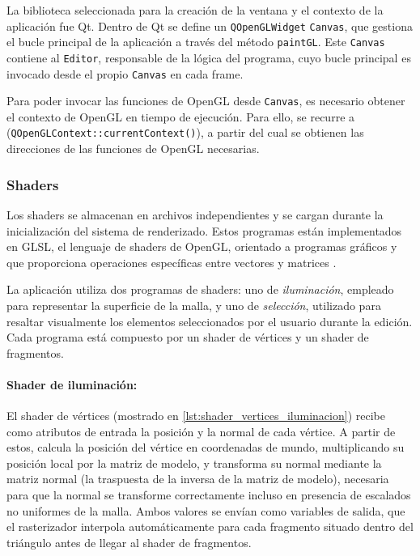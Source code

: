 La biblioteca seleccionada para la creación de la ventana y el contexto de la aplicación fue Qt. Dentro de Qt se define un \texttt{QOpenGLWidget} \texttt{Canvas}, que gestiona el bucle principal de la aplicación a través del método \texttt{paintGL}. Este \texttt{Canvas} contiene al \texttt{Editor}, responsable de la lógica del programa, cuyo bucle principal es invocado desde el propio \texttt{Canvas} en cada frame.

Para poder invocar las funciones de OpenGL desde \texttt{Canvas}, es necesario obtener el contexto de OpenGL en tiempo de ejecución. Para ello, se recurre a (\texttt{QOpenGLContext::\allowbreak currentContext()}), a partir del cual se obtienen las direcciones de las funciones de OpenGL necesarias.

\subsubsection{Shaders} \label{sec:shaders}

Los shaders se almacenan en archivos independientes y se cargan durante la inicialización del sistema de renderizado.  Estos programas están implementados en GLSL, el lenguaje de shaders de OpenGL, orientado a programas gráficos y que proporciona operaciones específicas entre vectores y matrices \cite{learnOpenGL_shaders, learnopengl_book}.

La aplicación utiliza dos programas de shaders: uno de \textit{iluminación}, empleado para representar la superficie de la malla, y uno de \textit{selección}, utilizado para resaltar visualmente los elementos seleccionados por el usuario durante la edición. Cada programa está compuesto por un shader de vértices y un shader de fragmentos.

\paragraph{Shader de iluminación:} \label{p:shader_iluminacion}El shader de vértices (mostrado en \ref{lst:shader_vertices_iluminacion}) recibe como atributos de entrada la posición y la normal de cada vértice. A partir de estos, calcula la posición del vértice en coordenadas de mundo, multiplicando su posición local por la matriz de modelo, y transforma su normal mediante la matriz normal (la traspuesta de la inversa de la matriz de modelo), necesaria para que la normal se transforme correctamente incluso en presencia de escalados no uniformes de la malla. Ambos valores se envían como variables de salida, que el rasterizador interpola automáticamente para cada fragmento situado dentro del triángulo antes de llegar al shader de fragmentos.

